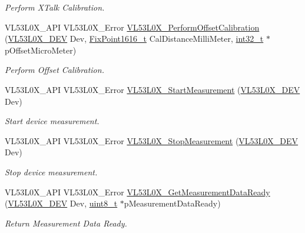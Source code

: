 \begin{DoxyCompactItemize}
\begin{DoxyCompactList}\small\item\em Perform X\+Talk Calibration. \end{DoxyCompactList}\item 
V\+L53\+L0\+X\+\_\+\+A\+PI V\+L53\+L0\+X\+\_\+\+Error \hyperlink{group__VL53L0X__measurement__group_gab33cdad2e9d45dd096b784b17013df3e}{V\+L53\+L0\+X\+\_\+\+Perform\+Offset\+Calibration} (\hyperlink{group__VL53L0X__platform__group_ga2d6405308b1dd524b462f1b8fb97d167}{V\+L53\+L0\+X\+\_\+\+D\+EV} Dev, \hyperlink{vl53l0x__types_8h_afb910790161809fc76e1a274a6349384}{Fix\+Point1616\+\_\+t} Cal\+Distance\+Milli\+Meter, \hyperlink{vl53l0x__types_8h_a32f2e37ee053cf2ce8ca28d1f74630e5}{int32\+\_\+t} $\ast$p\+Offset\+Micro\+Meter)
\begin{DoxyCompactList}\small\item\em Perform Offset Calibration. \end{DoxyCompactList}\item 
V\+L53\+L0\+X\+\_\+\+A\+PI V\+L53\+L0\+X\+\_\+\+Error \hyperlink{group__VL53L0X__measurement__group_gadd79559c9b3ef6ca4c4d378f08115be4}{V\+L53\+L0\+X\+\_\+\+Start\+Measurement} (\hyperlink{group__VL53L0X__platform__group_ga2d6405308b1dd524b462f1b8fb97d167}{V\+L53\+L0\+X\+\_\+\+D\+EV} Dev)
\begin{DoxyCompactList}\small\item\em Start device measurement. \end{DoxyCompactList}\item 
V\+L53\+L0\+X\+\_\+\+A\+PI V\+L53\+L0\+X\+\_\+\+Error \hyperlink{group__VL53L0X__measurement__group_ga7d2e62a19cd5dc5cd9a73b819e745888}{V\+L53\+L0\+X\+\_\+\+Stop\+Measurement} (\hyperlink{group__VL53L0X__platform__group_ga2d6405308b1dd524b462f1b8fb97d167}{V\+L53\+L0\+X\+\_\+\+D\+EV} Dev)
\begin{DoxyCompactList}\small\item\em Stop device measurement. \end{DoxyCompactList}\item 
V\+L53\+L0\+X\+\_\+\+A\+PI V\+L53\+L0\+X\+\_\+\+Error \hyperlink{group__VL53L0X__measurement__group_ga0052a146d166a0816ab696afda87ff49}{V\+L53\+L0\+X\+\_\+\+Get\+Measurement\+Data\+Ready} (\hyperlink{group__VL53L0X__platform__group_ga2d6405308b1dd524b462f1b8fb97d167}{V\+L53\+L0\+X\+\_\+\+D\+EV} Dev, \hyperlink{vl53l0x__types_8h_aba7bc1797add20fe3efdf37ced1182c5}{uint8\+\_\+t} $\ast$p\+Measurement\+Data\+Ready)
\begin{DoxyCompactList}\small\item\em Return Measurement Data Ready. \end{DoxyCompactList}\item 

\end{DoxyCompactItemize}
